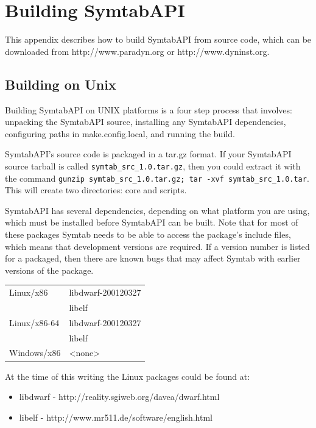 \appendix

\section{Building SymtabAPI}

This appendix describes how to build SymtabAPI from source code, which can be
downloaded from http://www.paradyn.org or http://www.dyninst.org.

\subsection{Building on Unix}

Building SymtabAPI on UNIX platforms is a four step process that involves:
unpacking the SymtabAPI source, installing any SymtabAPI dependencies,
configuring paths in make.config.local, and running the build.

SymtabAPI's source code is packaged in a tar.gz format. If your SymtabAPI
source tarball is called \texttt{symtab\_src\_1.0.tar.gz}, then you could extract
it with the command \texttt{gunzip symtab\_src\_1.0.tar.gz; tar -xvf
symtab\_src\_1.0.tar}. This will create two directories: core and scripts.

SymtabAPI has several dependencies, depending on what platform you are using,
which must be installed before SymtabAPI can be built. Note that for most of
these packages Symtab needs to be able to access the package's include files,
which means that development versions are required. If a version number is
listed for a packaged, then there are known bugs that may affect Symtab with
earlier versions of the package.

\begin{center}
    \begin{tabular}{ll}
Linux/x86       & libdwarf-200120327 \\
                & libelf\\
Linux/x86-64    & libdwarf-200120327 \\
                & libelf \\
Windows/x86     & <none> \\
\end{tabular}
\end{center}

At the time of this writing the Linux packages could be found at:
\begin{itemize}
    \item libdwarf - http://reality.sgiweb.org/davea/dwarf.html
    \item libelf - http://www.mr511.de/software/english.html
\end{itemize}

